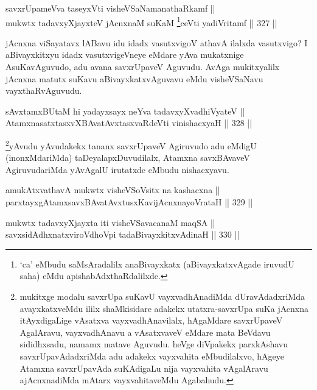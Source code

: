 \begin{shl}
savxrUpameVva taseyxVti visheVSaNamanathaRkamf || \\
mukwtx tadavxyXjayxteV jAcnxnaM suKaM \footnote{`ca' eMbudu saMsAradalilx anaBivayxkatx (aBivayxkatxvAgade iruvudU saha) eMdu apishabAdxthaRdalilxde.}ceVti yadiVritamf \hfill || 327 ||  
\end{shl}


\begin{artha}
jAcnxna viSayatavx lABavu idu idadx vasutxvigoV athavA
ilalxda vasutxvigo? I aBivayxkitxyu idadx vasutxvigeVneye eMdare yAva
mukatxnige AsuKavAguvudo, adu avana savxrUpaveV Aguvudu. AvAga
mukitxyalilx jAcnxna matutx suKavu aBivayxkatxvAguvavu eMdu
visheVSaNavu vayxthaRvAguvudu.
\end{artha}

\begin{shl}
sAvxtamxBUtaM hi yadayxsayx neYva tadavxyXvadhiVyateV || \\
AtamxnasatxtasxvXBAvatAvxtasxvaRdeVti vinishacxyaH \hfill || 328 ||  
\end{shl}

\begin{artha}
\footnote{mukitxge modalu savxrUpa suKavU vayxvadhAnadiMda
dUravAdadxriMda avayxkatxveMdu ililx shaMkisidare adakekx
utatxra-savxrUpa suKa jAcnxna itAyxdigaLige vAsatxva
vayxvadhAnavilalx, hAgaMdare savxrUpaveV AgalAravu, vayxvadhAnavu a
vAsatxvaveV eMdare mata BeVdavu sididhxsadu, namamx matave Aguvudu. heVge diVpakekx parxkAshavu savxrUpavAdadxriMda adu adakekx vayxvahita eMbudilalxvo, hAgeye Atamxna savxrUpavAda suKAdigaLu nija vayxvahita vAgalAravu ajAcnxnadiMda mAtarx vayxvahitaveMdu Agabahudu.}yAvudu yAvudakekx tananx savxrUpaveV Agiruvudo adu eMdigU
(inonxMdariMda) taDeyalapxDuvudilalx, Atamxna savxBAvaveV
AgiruvudariMda yAvAgalU irutatxde eMbudu nishacxyavu.
\end{artha}


\begin{shl}
amukAtxvathavA mukwtx visheVSoV\s sitx na kashacxna || \\
parxtayxgAtamxsavxBAvatAvxtusxKavijAcnxnayoVrataH \hfill || 329 ||  
\end{shl}

\begin{shl}
mukwtx tadavxyXjayxta iti visheVSavacanaM maqSA || \\
savxsidAdhxnatxviroVdhoV\s pi tadaBivayxkitxvAdinaH \hfill || 330 ||  
\end{shl}

